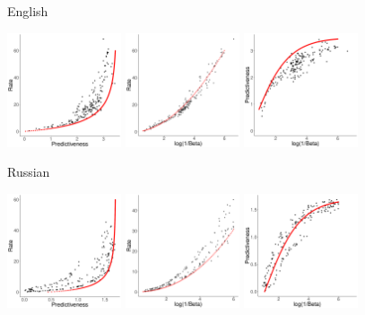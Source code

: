 \documentclass[11pt,letterpaper]{article}
\begin{document}
\begin{figure}
	\begin{center}
	English

\includegraphics[width=0.3\textwidth]{code/figures/en-words-info-fitted.pdf}
\includegraphics[width=0.3\textwidth]{code/figures/en-words-nlogbeta-mem-fitted.pdf}
\includegraphics[width=0.3\textwidth]{code/figures/en-words-nlogbeta-ee-fitted.pdf}

Russian

	\includegraphics[width=0.3\textwidth]{code/figures/ru-words-info-fitted.pdf}
\includegraphics[width=0.3\textwidth]{code/figures/ru-words-nlogbeta-mem-fitted.pdf}
\includegraphics[width=0.3\textwidth]{code/figures/ru-words-nlogbeta-ee-fitted.pdf}


\end{center}
\end{figure}
\end{document}
